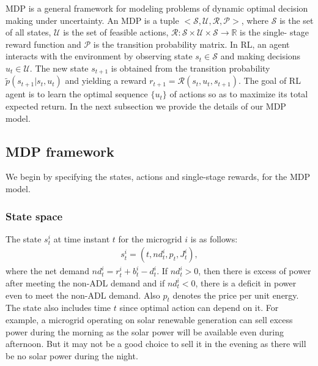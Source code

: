 MDP is a general framework for modeling problems of dynamic optimal decision making under uncertainty. An MDP is a tuple $<\mathcal{S},\mathcal{U},\mathcal{R},\mathcal{P}>$, where $\mathcal{S}$ is the set of all states, $\mathcal{U}$ is the set of  feasible actions, $\mathcal{R}:\mathcal{S}\times\mathcal{U}\times\mathcal{S}\to \mathbb{R} $ is the single- stage reward function and $\mathcal{P}$ is the transition probability matrix. In RL, an agent interacts with the environment by observing state $s_t \in \mathcal{S}$ and  making decisions $u_t \in \mathcal{U}$. The new state $s_{t+1}$ is obtained from the transition probability $ \tilde p(s_{t+1} | s_t,u_t)$ and yielding a reward $r_{t+1} = \mathcal{R}(s_t,u_t,s_{t+1})$. The goal of  RL agent is to learn the optimal sequence $\{u_t\}$ of actions so as to maximize its total expected return.
 In the next subsection we provide the details of our MDP model.
\subsection{MDP framework}
We begin by specifying the states, actions and single-stage rewards, for the MDP model.
\subsubsection{State space}
The state $s_{t}^{i}$ at time instant $t$  for the microgrid $i$ is as follows:
\begin{align}
s_{t}^{i} = (t,nd_{t}^{i},p_{t}, J_{t}^{i}),
\end{align}
where the net demand $nd_{t}^{i} = r_{t}^{i} + b_{t}^{i} - d_{t}^{i}$.
If $nd_{t}^{i} > 0$, then  there is excess of power after meeting the non-ADL demand and if $nd_{t}^{i} < 0$, there is a deficit in power even to meet the non-ADL demand. Also $p_{t}$ denotes the price per unit energy. The state also includes time $t$ since optimal action can depend on it. For example, a microgrid operating on solar renewable generation can sell excess power during the morning as the solar power will be available even during afternoon. But it may not be a good choice to sell it in the evening as there will be no solar power during the night. 
